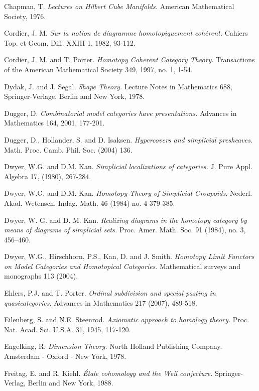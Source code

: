 \documentclass{report}[10pt, final]
\theoremstyle{definition}
\begin{document}
\begin{thebibliography}{99}
 Chapman, T. {\it Lectures on Hilbert Cube Manifolds.} American Mathematical Society, 1976.

 Cordier, J. M. {\it Sur la notion de diagramme homotopiquement coh\'{e}rent.} Cahiers Top. et Geom. Diff. XXIII 1, 1982, 93-112.

 Cordier, J. M. and T. Porter.
{\it Homotopy Coherent Category Theory}. Transactions of the American
Mathematical Society 349, 1997, no. 1, 1-54.

 Dydak, J. and J. Segal. {\it Shape Theory.} Lecture Notes in Mathematics 688, Springer-Verlage, Berlin and New York, 1978.

 Dugger, D. {\it Combinatorial model categories have presentations.} Advances in Mathematics 164, 2001, 177-201.

 Dugger, D., Hollander, S. and D. Isaksen. {\it
Hypercovers and simplicial presheaves}. Math. Proc. Camb. Phil. Soc. (2004) 136. 

 Dwyer, W.G. and D.M. Kan. {\it Simplicial localizations
of categories.} J. Pure Appl. Algebra 17, (1980), 267-284.

 Dwyer, W.G. and D.M. Kan. {\it Homotopy Theory of
Simplicial Groupoids.} Nederl. Akad. Wetensch. Indag. Math. 46
(1984) no. 4 379-385.

 Dwyer, W. G. and D. M. Kan. {\it Realizing diagrams in the homotopy category by means of diagrams of simplicial sets.} Proc. Amer. Math. Soc. 91 (1984), no. 3, 456--460.

 Dwyer, W.G., Hirschhorn, P.S., Kan, D. and J. Smith. {\it Homotopy Limit Functors on Model Categories and Homotopical Categories}. Mathematical surveys and monographs 113 (2004).

 Ehlers, P.J. and T. Porter. {\it Ordinal subdivision and special pasting in quasicategories.} Advances in Mathematics 217 (2007), 489-518.

 Eilenberg, S. and N.E. Steenrod. {\it Axiomatic approach to homology theory.} Proc. Nat. Acad. Sci. U.S.A. 31, 1945, 117-120.

 Engelking, R. {\it Dimension Theory.} North Holland Publishing Company. Amsterdam - Oxford - New York, 1978. 

 Freitag, E. and R. Kiehl. {\it \'{E}tale cohomology and the Weil conjecture.} Springer-Verlag, Berlin and New York, 1988.


\end{thebibliography}
\end{document}
